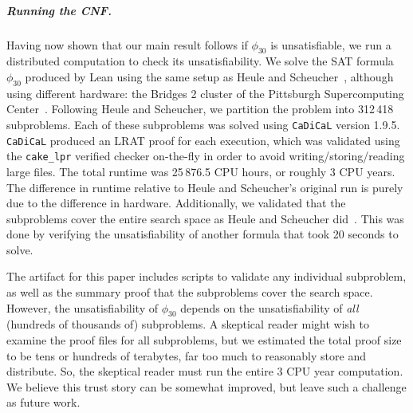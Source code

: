 \subparagraph*{Running the CNF.}
Having now shown that our main result follows if $\phi_{30}$ is unsatisfiable,
we run a distributed computation to check its unsatisfiability.
We solve the SAT formula~$\phi_{30}$ produced by Lean using the same setup as
Heule and Scheucher~\cite{emptyHexagonNumber}, although using different hardware:
the Bridges 2 cluster of the Pittsburgh Supercomputing Center~\cite{cluster}.
Following Heule and Scheucher,
we partition the problem into 312\,418 subproblems.
Each of these subproblems was
solved using {\tt CaDiCaL} version 1.9.5.
{\tt CaDiCaL} produced an LRAT proof for each execution,
which was validated using the {\tt cake\_lpr} verified checker on-the-fly
in order to avoid writing/storing/reading large files.
The total runtime was 25\,876.5 CPU hours, or roughly 3 CPU years.
The difference in runtime relative to Heule and Scheucher's original run
is purely due to the difference in hardware.
Additionally,
we validated that the subproblems cover the entire search space
as Heule and Scheucher did~\cite[Section 7.3]{emptyHexagonNumber}.
This was done by verifying the unsatisfiability
of another formula that took 20 seconds to solve.

The artifact for this paper includes scripts to validate any individual subproblem,
as well as the summary proof that the subproblems cover the search space.
However, the unsatisfiability of $\phi_{30}$ depends on
the unsatisfiability of \textit{all} (hundreds of thousands of) subproblems.
A skeptical reader might wish to examine the proof files for all subproblems,
but we estimated the total proof size to be tens or hundreds of terabytes,
far too much to reasonably store and distribute.
So, the skeptical reader must run the entire 3 CPU year computation.
We believe this trust story can be somewhat improved,
but leave such a challenge as future work.


